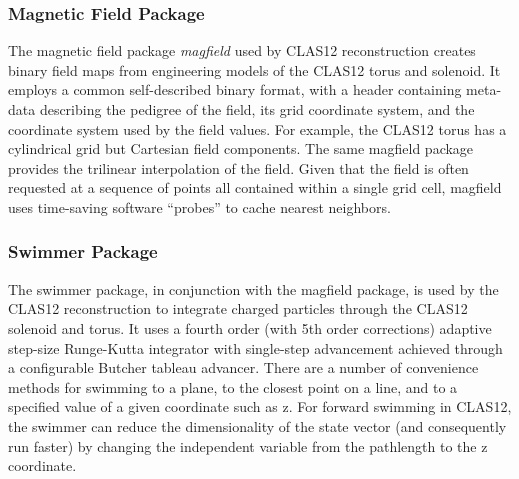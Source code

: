 \subsubsection{Magnetic Field Package}
The magnetic field package {\it magfield} used by CLAS12 reconstruction creates
binary field maps from engineering models of the CLAS12 torus and solenoid. It employs
a common self-described binary format, with a header containing meta-data describing
the pedigree of the field, its grid coordinate system, and the coordinate system
used by the field values. For example, the CLAS12 torus has a cylindrical grid
but Cartesian field components. The same magfield package provides the trilinear
interpolation of the field. Given that the field is often requested at a sequence
of points all contained within a single grid cell, magfield uses time-saving
software “probes” to cache nearest neighbors.

\subsubsection{Swimmer Package}
The swimmer package, in conjunction with the magfield package, is used by the CLAS12
reconstruction to integrate charged particles through the CLAS12 solenoid and torus.
It uses a fourth order (with 5th order corrections) adaptive step-size Runge-Kutta integrator
with single-step advancement achieved through a configurable Butcher tableau advancer.
There are a number of convenience methods for swimming to a plane, to the closest
point on a line, and to a specified value of a given coordinate such as z. For
forward swimming in CLAS12, the swimmer can reduce the dimensionality of the state
vector (and consequently run faster) by changing the independent variable from
the pathlength to the z coordinate.

